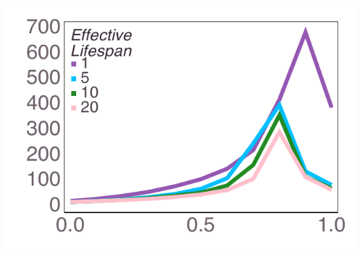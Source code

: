 \documentclass[varwidth=true,crop=false]{standalone}
\begin{document}
	\begin{minipage}{3.75in}%
      \includegraphics[width=\textwidth]{Figures/step_over_u_lowpayoff=0.45_nbehaviors=10.pdf}
    \end{minipage}~\\[4.0em]
\end{document}
